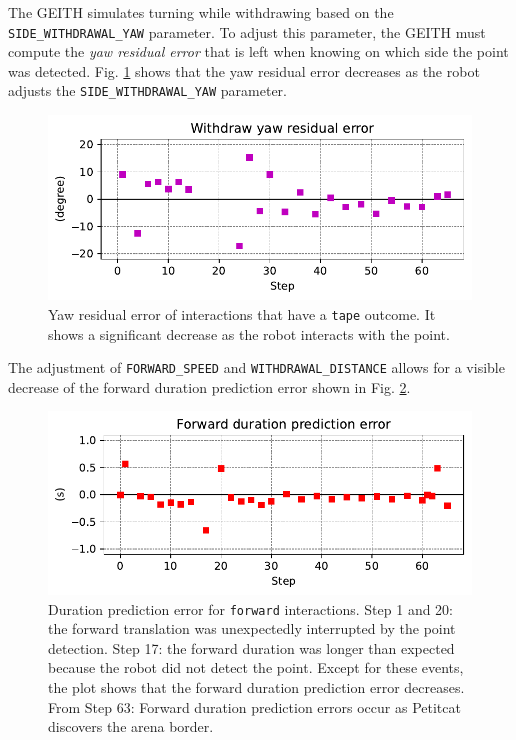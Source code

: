\documentclass[runningheads]{llncs}
\begin{document}
The GEITH simulates turning while withdrawing based on the \texttt{SIDE\_WITH\-DRA\-WAL\_YAW} parameter.
To adjust this parameter, the GEITH must 
compute the \textit{yaw residual error} 
that is left when knowing on which side the point was detected. 
Fig. \ref{fig:yaw_re} shows that the yaw residual error decreases as the robot adjusts the \texttt{SIDE\_WITH\-DRA\-WAL\_YAW} parameter.

\begin{figure}
	\includegraphics[width=\textwidth]{03_yaw_re.pdf}
	\caption{Yaw residual error of interactions that have a \texttt{tape} outcome. 
		It shows a significant decrease as the robot interacts with the point.
	} \label{fig:yaw_re}
\end{figure}

The adjustment of \texttt{FORWARD\_SPEED} and \texttt{WITHDRAWAL\_DIS\-TANCE} allows for a visible decrease of the forward duration prediction error shown in Fig. \ref{fig:forward_re}.

\begin{figure}
	\includegraphics[width=\textwidth]{07_Forward_duration_pe.pdf}
	\caption{Duration prediction error for \texttt{forward} interactions.
	Step 1 and 20: the forward translation was unexpectedly interrupted by the point detection.
	Step 17: the forward duration was longer than expected because the robot did not detect the point.
	Except for these events, the plot shows that the forward duration prediction error decreases.
	From Step 63: Forward duration prediction errors occur as Petitcat discovers the arena border.
	} \label{fig:forward_re}
\end{figure}
\end{document}
